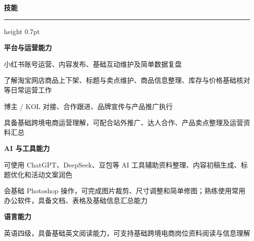 \documentclass[10pt,a4paper]{article}
\newcommand{\sectionTitle}[1]{%
  \vspace{12pt}
  {\large\bfseries\color{resumeBlue}#1}\par
  \vspace{5pt}
  {\color{resumeRule}\hrule height 0.7pt}
  \vspace{6pt}
}
\begin{document}
\sectionTitle{技能}

{\bfseries 平台与运营能力}
\begin{resumeBullets}
  \item 小红书账号运营、内容发布、基础互动维护及简单数据复盘
  \item 了解淘宝网店商品上下架、标题与卖点维护、商品信息整理、库存与价格基础核对等日常运营工作
  \item 博主 / KOL 对接、合作跟进、品牌宣传与产品推广执行
  \item 具备基础跨境电商运营理解，可配合站外推广、达人合作、产品卖点整理及运营资料汇总
\end{resumeBullets}

\vspace{3pt}
{\bfseries AI 与工具能力}
\begin{resumeBullets}
  \item 可使用 ChatGPT、DeepSeek、豆包等 AI 工具辅助资料整理、内容初稿生成、标题优化和活动文案润色
  \item 会基础 Photoshop 操作，可完成图片裁剪、尺寸调整和简单修图；熟练使用常用办公软件，具备文档、表格及基础信息汇总能力
\end{resumeBullets}

\vspace{3pt}
{\bfseries 语言能力}
\begin{resumeBullets}
  \item 英语四级，具备基础英文阅读能力，可支持基础跨境电商岗位资料阅读与信息理解
\end{resumeBullets}
\end{document}
